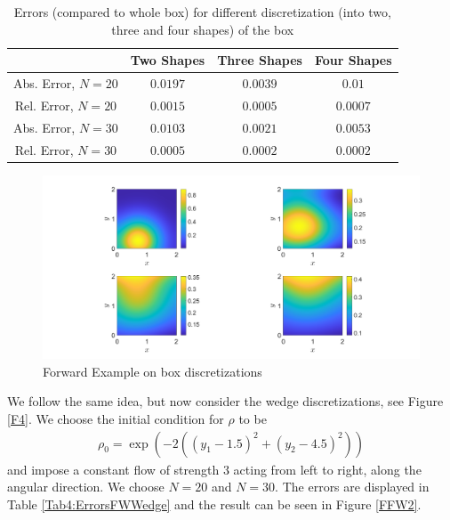 \documentclass[11pt, a4paper]{article}
\theoremstyle{definition}
\begin{document}
\begin{table}
	\caption{Errors (compared to whole box) for different discretization (into two, three and four shapes) of the box}
	\begin{tabular}{ ||c| c| c| c|| }
		\hline
		\hline
		& Two Shapes & Three Shapes & Four Shapes\\ 
		\hline
		Abs. Error, $N =20$& $0.0197$ & $0.0039$ & $0.01$ \\  
		Rel. Error, $N =20$& $0.0015$& $0.0005$ &$0.0007$ \\
		Abs. Error, $N =30$& $0.0103$ & $0.0021$ & $0.0053$  \\  
		Rel. Error, $N =30$ & $0.0005$& $0.0002$ &$0.0002$  \\
		\hline
		\hline
	\end{tabular}
	\label{Tab3:ErrorsFWBox}
\end{table}
\begin{figure}[h]
	\centering
	\includegraphics[scale=0.35]{FWBox.png}
	\caption{Forward Example on box discretizations} 
	\label{FFW1}
\end{figure}


We follow the same idea, but now consider the wedge discretizations, see Figure \ref{F4}. We choose the initial condition for $\rho$ to be
\begin{align*}
	\rho_0 = \exp(-2((y_1 - 1.5 )^2 + (y_2 - 4.5)^2))
\end{align*}
and impose a constant flow of strength $3$ acting from left to right, along the angular direction.
We choose $N = 20$ and $N = 30$. The errors are displayed in Table \ref{Tab4:ErrorsFWWedge} and the result can be seen in Figure \ref{FFW2}. 
\end{document}
